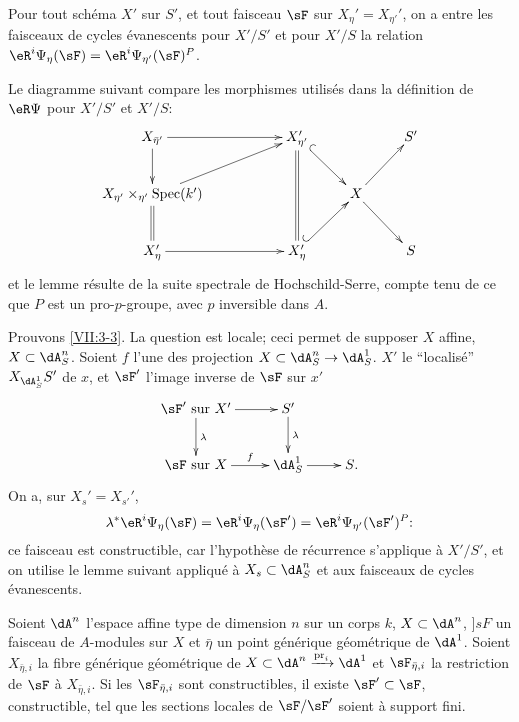 \begin{lemma_}\label{VII:3-4}
Pour tout schéma $X'$ sur $S'$, et tout faisceau $\sF$ sur 
$X_\eta'=X_{\eta'}'$, on a entre les faisceaux de cycles évanescents pour 
$X'/S'$ et pour $X'/S$ la relation 
$\eR^i \Psi_\eta(\sF) =\eR^i\Psi_{\eta'}(\sF)^P$. 
\end{lemma_}

Le diagramme suivant compare les morphismes utilisés dans la définition de 
$\eR\Psi$ pour $X'/S'$ et $X'/S$: 
\[\xymatrix{
  X_{\bar\eta'} \ar[rr] \ar[d] 
    & & X_{\eta'}' \ar@{=}[dd] \ar@{^{(}->}[dr] 
    & & S' \\ 
  X_{\eta'}\times_{\eta'}\spec(k') \ar@{=}[d] \ar[urr] 
    & & & X \ar[ur] \ar[dr] \\
  X_\eta' \ar[rr] 
    & & X_\eta' \ar@{^{(}->}[ur] 
    & & S
}\]
et le lemme résulte de la suite spectrale de Hochschild-Serre, compte tenu de 
ce que $P$ est un pro-$p$-groupe, avec $p$ inversible dans $A$. 

Prouvons \ref{VII:3-3}. La question est locale; ceci permet de supposer $X$ 
affine, $X\subset \dA_S^n$. Soient $f$ l'une des projection 
$X\subset \dA_S^n\to \dA_S^1$. $X'$ le ``localisé'' $X_{\dA_S^1} S'$ de $x$, 
et $\sF'$ l'image inverse de $\sF$ sur $x'$ 
\[\xymatrix{
  \sF'\text{ sur }X' \ar[r] \ar[d]^-\lambda 
    & S' \ar[d]^-\lambda \\
  \sF \text{ sur }X \ar[r]^-f 
    & \dA_S^1 \ar[r] 
    & S \text{.} 
}\]
On a, sur $X_s'=X_{s'}'$, 
\[
  \lambda^\ast \eR^i\Psi_\eta(\sF) = \eR^i \Psi_\eta(\sF') = \eR^i\Psi_{\eta'}(\sF')^P \text{:} 
\]
ce faisceau est constructible, car l'hypothèse de récurrence s'applique à 
$X'/S'$, et on utilise le lemme suivant appliqué à $X_s\subset \dA_S^n$ et 
aux faisceaux de cycles évanescents. 





\begin{lemma_}\label{VII:3-5}
Soient $\dA^n$ l'espace affine type de dimension $n$ sur un corps $k$, 
$X\subset \dA^n$, $]sF$ un faisceau de $A$-modules sur $X$ et $\bar\eta$ un 
point générique géométrique de $\dA^1$. Soient $X_{\bar\eta,i}$ la 
fibre générique géométrique de 
$X\subset \dA^n\xrightarrow{\pr_i} \dA^1$ et $\sF_{\bar\eta,i}$ la restriction 
de $\sF$ à $X_{\bar\eta,i}$. Si les $\sF_{\bar\eta,i}$ sont constructibles, 
il existe $\sF'\subset \sF$, constructible, tel que les sections locales de 
$\sF/\sF'$ soient à support fini. 
\end{lemma_}

